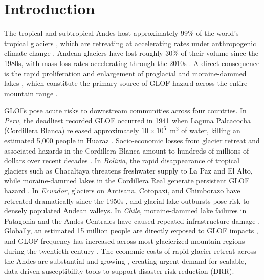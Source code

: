 \documentclass[pdflatex,sn-basic]{sn-jnl}%
\begin{document}

\maketitle

\linenumbers

\section{Introduction}\label{sec:intro}

The tropical and subtropical Andes host approximately 99\% of the
world's tropical glaciers \citep{Rabatel2013}, which are retreating at
accelerating rates under anthropogenic climate change
\citep{Zemp2019,Hugonnet2021,GlaMBIE2025}. Andean glaciers have lost
roughly 30\% of their volume since the 1980s, with mass-loss rates
accelerating through the 2010s \citep{Dussaillant2019,Masiokas2020}. A
direct consequence is the rapid proliferation and enlargement of
proglacial and moraine-dammed lakes \citep{Haeberli2017,Shugar2020,
Wood2021,Carrivick2013}, which constitute the primary source of GLOF hazard across
the entire mountain range \citep{Rounce2024,Emmer2017,EmmerHarrison2020,Zheng2021}.

GLOFs pose acute risks to downstream communities across four countries.
In \textit{Peru}, the deadliest recorded GLOF occurred in 1941 when
Laguna Palcacocha (Cordillera Blanca) released approximately
$10{\times}10^6$~m$^3$ of water, killing an estimated 5{,}000 people in
Huaraz \citep{Carey2010}. Socio-economic losses from glacier retreat and
associated hazards in the Cordillera Blanca amount to hundreds of
millions of dollars over recent decades
\citep{Motschmann2020,Bury2011,Baraer2012}. In \textit{Bolivia}, the
rapid disappearance of tropical glaciers such as Chacaltaya threatens
freshwater supply to La Paz and El Alto, while moraine-dammed lakes in
the Cordillera Real generate persistent GLOF hazard
\citep{Francou2003,Rabatel2006}. In \textit{Ecuador}, glaciers on
Antisana, Cotopaxi, and Chimborazo have retreated dramatically since
the 1950s \citep{Caceres2010,Veettil2019}, and glacial lake outbursts
pose risk to densely populated Andean valleys. In \textit{Chile},
moraine-dammed lake failures in Patagonia and the Andes Centrales have
caused repeated infrastructure damage
\citep{IribarrenAnacona2014,IribarrenAnacona2015}. Globally, an
estimated 15 million people are directly exposed to GLOF impacts
\citep{Taylor2023}, and GLOF frequency has increased across most
glacierized mountain regions during the twentieth century
\citep{Lutzow2023,Veh2022,Veh2023,Zheng2021}. The economic costs of rapid glacier retreat
across the Andes are substantial and growing
\citep{Vergara2007,Immerzeel2010,Immerzeel2020}, creating urgent demand
for scalable, data-driven susceptibility tools to support disaster risk
reduction (DRR).
\end{document}
